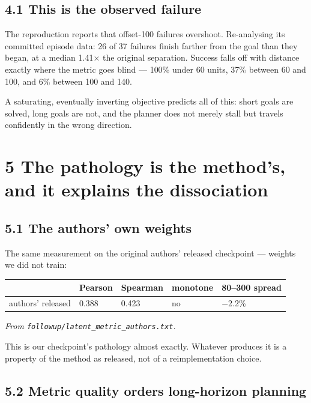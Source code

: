 \documentclass[10pt]{article}
\newcounter{none}
\begin{document}
\subsection{4.1 This is the observed failure}\label{this-is-the-observed-failure}

The reproduction reports that offset-100 failures overshoot. Re-analysing its
committed episode data: 26 of 37 failures finish farther from the goal than
they began, at a median 1.41$\times$ the original separation. Success falls off with
distance exactly where the metric goes blind --- 100\% under 60 units, 37\%
between 60 and 100, and 6\% between 100 and 140.

A saturating, eventually inverting objective predicts all of this: short goals
are solved, long goals are not, and the planner does not merely stall but
travels confidently in the wrong direction.

\section{5 The pathology is the method's, and it explains the dissociation}\label{the-pathology-is-the-methods-and-it-explains-the-dissociation}

\subsection{5.1 The authors' own weights}\label{the-authors-own-weights}

The same measurement on the original authors' released checkpoint --- weights we
did not train:

{\def\LTcaptype{none} %
\begin{longtable}[]{@{}lllll@{}}
\toprule\noalign{}
& Pearson & Spearman & monotone & 80--300 spread \\
\midrule\noalign{}
\endhead
\bottomrule\noalign{}
\endlastfoot
authors' released & 0.388 & 0.423 & no & $-$2.2\% \\
\end{longtable}
}

\emph{From \texttt{followup/latent\_metric\_authors.txt}.}

This is our checkpoint's pathology almost exactly. Whatever produces it is a
property of the method as released, not of a reimplementation choice.

\subsection{5.2 Metric quality orders long-horizon planning}\label{metric-quality-orders-long-horizon-planning}
\end{document}
